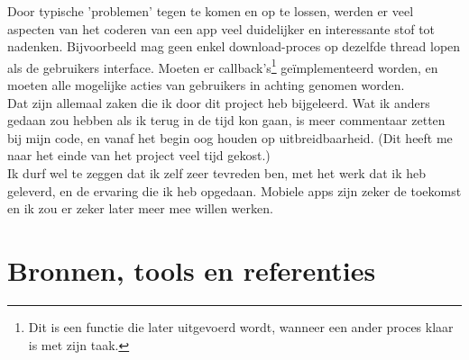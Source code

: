 \documentclass[11pt,a4paper]{article}
\begin{document}
Door typische 'problemen' tegen te komen en op te lossen, werden er veel aspecten van het coderen van een app veel duidelijker en interessante stof tot nadenken. Bijvoorbeeld mag geen enkel download-proces op dezelfde thread lopen als de gebruikers interface. Moeten er callback's\footnote{Dit is een functie die later uitgevoerd wordt, wanneer een ander proces klaar is met zijn taak.} geïmplementeerd worden, en moeten alle mogelijke acties van gebruikers in achting genomen worden. \\

Dat zijn allemaal zaken die ik door dit project heb bijgeleerd. Wat ik anders gedaan zou hebben als ik terug in de tijd kon gaan, is meer commentaar zetten bij mijn code, en vanaf het begin oog houden op uitbreidbaarheid. (Dit heeft me naar het einde van het project veel tijd gekost.) \\

Ik durf wel te zeggen dat ik zelf zeer tevreden ben, met het werk dat ik heb geleverd, en de ervaring die ik heb opgedaan. Mobiele apps zijn zeker de toekomst en ik zou er zeker later meer mee willen werken.

\newpage	
\section{Bronnen, tools en referenties}
	\label{sec:Bronnen}
\end{document}

